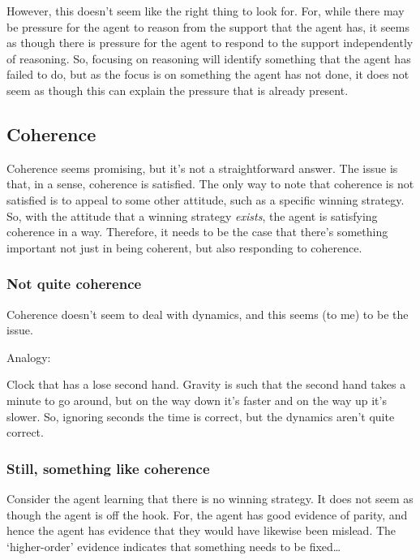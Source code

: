 \documentclass[10pt]{article}
\begin{document}
However, this doesn't seem like the right thing to look for.
For, while there may be pressure for the agent to reason from the support that the agent has, it seems as though there is pressure for the agent to respond to the support independently of reasoning.
So, focusing on reasoning will identify something that the agent has failed to do, but as the focus is on something the agent has not done, it does not seem as though this can explain the pressure that is already present.

\subsection{Coherence}
\label{sec:coherence}

Coherence seems promising, but it's not a straightforward answer.
The issue is that, in a sense, coherence is satisfied.
The only way to note that coherence is not satisfied is to appeal to some other attitude, such as a specific winning strategy.
So, with the attitude that a winning strategy \emph{exists}, the agent is satisfying coherence in a way.
Therefore, it needs to be the case that there's something important not just in being coherent, but also responding to coherence.


\subsubsection{Not quite coherence}
\label{sec:not-quite-coherence}

Coherence doesn't seem to deal with dynamics, and this seems (to me) to be the issue.

Analogy:

Clock that has a lose second hand.
Gravity is such that the second hand takes a minute to go around, but on the way down it's faster and on the way up it's slower.
So, ignoring seconds the time is correct, but the dynamics aren't quite correct.

\subsubsection{Still, something like coherence}
\label{sec:still-something-like}

Consider the agent learning that there is no winning strategy.
It does not seem as though the agent is off the hook.
For, the agent has good evidence of parity, and hence the agent has evidence that they would have likewise been mislead.
The `higher-order' evidence indicates that something needs to be fixed\dots
\end{document}
